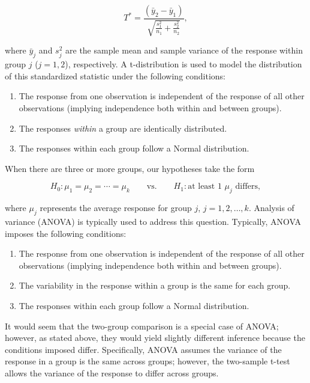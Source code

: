 \documentclass[
  letterpaper,
  DIV=11,
  numbers=noendperiod]{scrreprt}
\providecommand{\tightlist}{%
  \setlength{\itemsep}{0pt}\setlength{\parskip}{0pt}}\usepackage{longtable,booktabs,array}
\theoremstyle{definition}
\theoremstyle{definition}
\theoremstyle{remark}
\begin{document}
\[T^* = \frac{\left(\bar{y}_2 - \bar{y}_1\right)}{\sqrt{\frac{s_1^2}{n_1} + \frac{s_2^2}{n_2}}},\]

where \(\bar{y}_j\) and \(s^2_j\) are the sample mean and sample
variance of the response within group \(j\) (\(j = 1, 2\)),
respectively. A t-distribution is used to model the distribution of this
standardized statistic under the following conditions:

\begin{enumerate}
\def\labelenumi{\arabic{enumi}.}
\tightlist
\item
  The response from one observation is independent of the response of
  all other observations (implying independence both within and between
  groups).
\item
  The responses \emph{within} a group are identically distributed.
\item
  The responses within each group follow a Normal distribution.
\end{enumerate}

When there are three or more groups, our hypotheses take the form

\[H_0: \mu_1 = \mu_2 = \dotsb = \mu_k \qquad \text{vs.} \qquad H_1: \text{at least 1 } \mu_j \text{ differs},\]

where \(\mu_j\) represents the average response for group \(j\),
\(j = 1, 2, \dotsc, k\). Analysis of variance (ANOVA) is typically used
to address this question. Typically, ANOVA imposes the following
conditions:

\begin{enumerate}
\def\labelenumi{\arabic{enumi}.}
\tightlist
\item
  The response from one observation is independent of the response of
  all other observations (implying independence both within and between
  groups).
\item
  The variability in the response within a group is the same for each
  group.
\item
  The responses within each group follow a Normal distribution.
\end{enumerate}

It would seem that the two-group comparison is a special case of ANOVA;
however, as stated above, they would yield slightly different inference
because the conditions imposed differ. Specifically, ANOVA assumes the
variance of the response in a group is the same across groups; however,
the two-sample t-test allows the variance of the response to differ
across groups.
\end{document}
